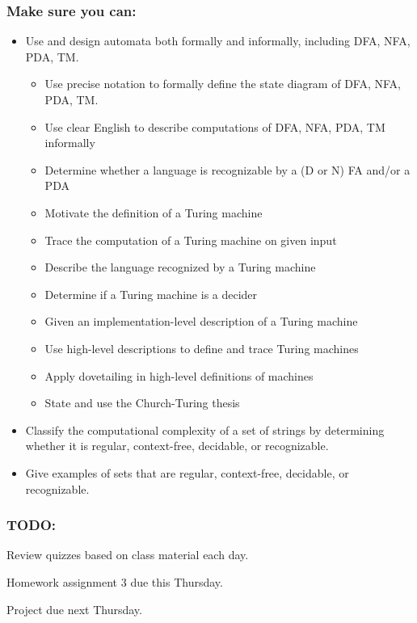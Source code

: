\subsubsection*{Make sure you can:}
\begin{itemize}
\item Use and design automata both formally and informally, including DFA, NFA, PDA, TM.
    \begin{itemize}
        \item Use precise notation to formally define the state diagram of DFA, NFA, PDA, TM.
        \item Use clear English to describe computations of DFA, NFA, PDA, TM informally
        \item Determine whether a language is recognizable by a (D or N) FA and/or a PDA
        \item Motivate the definition of a Turing machine
        \item Trace the computation of a Turing machine on given input
        \item Describe the language recognized by a Turing machine
        \item Determine if a Turing machine is a decider
        \item Given an implementation-level description of a Turing machine
        \item Use high-level descriptions to define and trace Turing machines
        \item Apply dovetailing in high-level definitions of machines
        \item State and use the Church-Turing thesis
    \end{itemize}
\item Classify the computational complexity of a set of strings by determining whether it is regular, context-free, decidable, or recognizable.
\item Give examples of sets that are regular, context-free, decidable, or recognizable.
\end{itemize}

\begin{comment}
\end{comment}

\subsubsection*{TODO:}
\begin{list}
   {\itemsep2pt}
   \item Review quizzes based on class material each day.
   \item Homework assignment 3 due this Thursday.
   \item Project due next Thursday.
\end{list}

